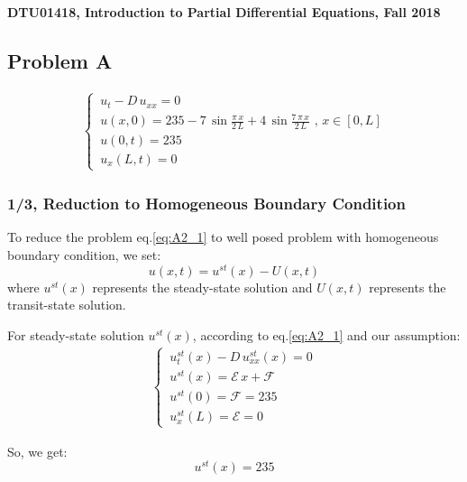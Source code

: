 \documentclass[../main.tex]{subfiles}
\begin{document}
\textbf{DTU01418, Introduction to Partial Differential Equations, Fall 2018}

\subsection{Problem A}

\begin{align}
    \begin{cases} \label{eq:A2_1}
        \, u_t - D \, u_{xx} = 0 \\
        \, u(x,0) = 235 - 7 \, \sin{\frac{\pi \, x}{2 \, L}} + 4 \, \sin{\frac{7 \, \pi \, x}{2 \, L}} \text{ ,  } x \in [0,L] \\
        \, u(0,t) = 235 \\
        \, u_x(L,t) = 0
    \end{cases}
\end{align}

\subsubsection{1/3, Reduction to Homogeneous Boundary Condition}

To reduce the problem eq.\ref{eq:A2_1} to well posed problem with homogeneous boundary condition, we set:
\begin{equation} \label{eq:A2_2}
    u(x,t) = u^{st}(x) - U(x,t)
\end{equation}
where $u^{st}(x)$ represents the steady-state solution and $U(x,t)$ represents the transit-state solution.

For steady-state solution $u^{st}(x)$, according to eq.\ref{eq:A2_1} and our assumption:
\begin{align}
    \begin{cases} \label{eq:A2_3}
        \, u^{st}_t(x) - D \, u^{st}_{xx}(x) = 0 \\
        \, u^{st}(x) = \mathcal{E} \, x + \mathcal{F} \\
        \, u^{st}(0) = \mathcal{F} = 235 \\
        \, u^{st}_x(L) = \mathcal{E} = 0
    \end{cases}
\end{align}

So, we get:
\begin{equation} \label{eq:A2_4}
    u^{st}(x) = 235
\end{equation}
\end{document}
